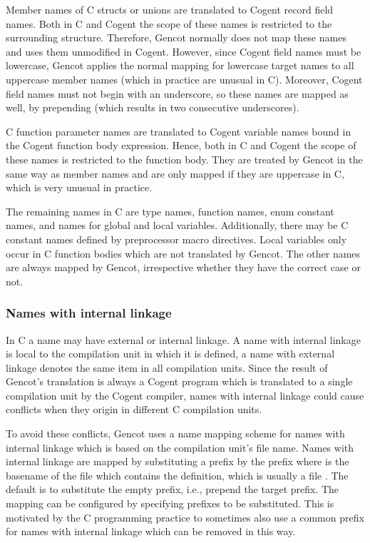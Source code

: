Member names of C structs or unions are translated to Cogent record field names. Both in C and Cogent the scope of these
names is restricted to the surrounding structure. Therefore, Gencot normally does not map these names and uses them unmodified
in Cogent. However, since Cogent field names must be lowercase, Gencot applies the normal mapping for lowercase target 
names to all uppercase member names (which in practice are unusual in C). Moreover, Cogent field names must not begin
with an underscore, so these names are mapped as well, by prepending  (which results in two consecutive 
underscores).

C function parameter names are translated to Cogent variable names bound in the Cogent function body expression. Hence, both
in C and Cogent the scope of these names is restricted to the function body. They are treated by Gencot in the same way as 
member names and are only mapped if they are uppercase in C, which is very unusual in practice.

The remaining names in C are type names, function names, enum constant names, and names for global and local variables.
Additionally, there may be C constant names defined by preprocessor macro directives.
Local variables only occur in C function bodies which are not translated by Gencot. The other names are always mapped by
Gencot, irrespective whether they have the correct case or not.

\subsubsection{Names with internal linkage}

In C a name may have external or internal linkage. A name with internal linkage is local to the compilation unit in which it
is defined, a name with external linkage denotes the same item in all compilation units. Since the result of Gencot's 
translation is always a Cogent program which is translated to a single compilation unit by the Cogent compiler, names 
with internal linkage could cause conflicts when they origin in different C compilation units.

To avoid these conflicts, Gencot uses a name mapping scheme for names with internal linkage which is based on the 
compilation unit's file name. Names with internal linkage are mapped by substituting a prefix by the prefix 
where  is the basename of the file which contains the definition, which is usually a file . The default
is to substitute the empty prefix, i.e., prepend the target prefix. The mapping can be configured by specifying prefixes
to be substituted. This is motivated by the C programming practice to sometimes also use a common prefix for names 
with internal linkage which can be removed in this way.

